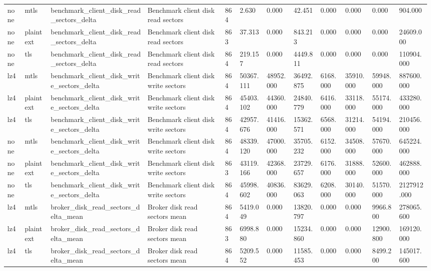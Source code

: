 \begin{longtable}{llllllllllll}
none & mtls & benchmark\_client\_disk\_read\_sectors\_delta & Benchmark client disk read sectors & 864 & 2.630 & 0.000 & 42.451 & 0.000 & 0.000 & 0.000 & 904.000 \\
none & plaintext & benchmark\_client\_disk\_read\_sectors\_delta & Benchmark client disk read sectors & 863 & 37.313 & 0.000 & 843.213 & 0.000 & 0.000 & 0.000 & 24609.000 \\
none & tls & benchmark\_client\_disk\_read\_sectors\_delta & Benchmark client disk read sectors & 864 & 219.157 & 0.000 & 4449.811 & 0.000 & 0.000 & 0.000 & 110904.000 \\
lz4 & mtls & benchmark\_client\_disk\_write\_sectors\_delta & Benchmark client disk write sectors & 864 & 50367.111 & 48952.000 & 36492.875 & 6168.000 & 35910.000 & 59948.000 & 887600.000 \\
lz4 & plaintext & benchmark\_client\_disk\_write\_sectors\_delta & Benchmark client disk write sectors & 864 & 45403.102 & 44360.000 & 24840.779 & 6416.000 & 33118.000 & 55174.000 & 433280.000 \\
lz4 & tls & benchmark\_client\_disk\_write\_sectors\_delta & Benchmark client disk write sectors & 864 & 42957.676 & 41416.000 & 15362.571 & 6568.000 & 31214.000 & 54194.000 & 210456.000 \\
none & mtls & benchmark\_client\_disk\_write\_sectors\_delta & Benchmark client disk write sectors & 864 & 48339.120 & 47000.000 & 35705.232 & 6152.000 & 34508.000 & 57670.000 & 645224.000 \\
none & plaintext & benchmark\_client\_disk\_write\_sectors\_delta & Benchmark client disk write sectors & 863 & 43119.166 & 42368.000 & 23729.657 & 6176.000 & 31888.000 & 52600.000 & 462888.000 \\
none & tls & benchmark\_client\_disk\_write\_sectors\_delta & Benchmark client disk write sectors & 864 & 45998.602 & 40836.000 & 83629.063 & 6208.000 & 30140.000 & 51570.000 & 2127912.000 \\
lz4 & mtls & broker\_disk\_read\_sectors\_delta\_mean & Broker disk read sectors mean & 864 & 5419.049 & 0.000 & 13820.797 & 0.000 & 0.000 & 9966.800 & 278065.600 \\
lz4 & plaintext & broker\_disk\_read\_sectors\_delta\_mean & Broker disk read sectors mean & 863 & 6998.880 & 0.000 & 15234.860 & 0.000 & 0.000 & 12900.800 & 169120.000 \\
lz4 & tls & broker\_disk\_read\_sectors\_delta\_mean & Broker disk read sectors mean & 864 & 5209.552 & 0.000 & 11585.453 & 0.000 & 0.000 & 8499.200 & 145017.600 \\

\end{longtable}
